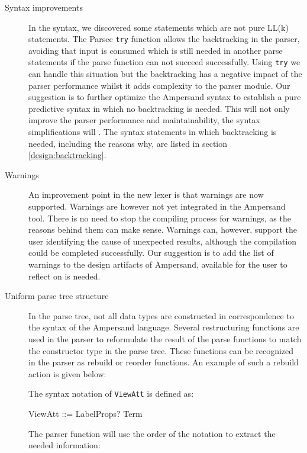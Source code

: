 \begin{description}
  \item[Syntax improvements]
    In the syntax, we discovered some statements which are not pure LL(k) statements.
    The Parsec \texttt{try} function allows the backtracking in the parser, avoiding that input is consumed which is still needed in another parse statements if the parse function can not succeed successfully.
    Using \texttt{try} we can handle this situation but the backtracking has a negative impact of the parser performance whilst it adds complexity to the parser module. 
    Our suggestion is to further optimize the Ampersand syntax to establish a pure predictive syntax in which no backtracking is needed.
    This will not only improve the parser performance and maintainability, the syntax simplifications will .
    The syntax statements in which backtracking is needed, including the reasons why, are listed in section \ref{design:backtracking}.

  \item[Warnings]
    An improvement point in the new lexer is that warnings are now supported. 
    Warnings are however not yet integrated in the Ampersand tool.
    There is no need to stop the compiling process for warnings, as the reasons behind them can make sense.
    Warnings can, however, support the user identifying the cause of unexpected results, although the compilation could be completed successfully.
    Our suggestion is to add the list of warnings to the design artifacts of Ampersand, available for the user to reflect on is needed.

  \item[Uniform parse tree structure]
  
   In the parse tree, not all data types are constructed in correspondence to the syntax of the Ampersand language.
   Several restructuring functions are used in the parser to reformulate the result of the parse functions to match the constructor type in the parse tree.
   These functions can be recognized in the parser as rebuild or reorder functions.
   An example of such a rebuild action is given below:

   The syntax notation of \texttt{ViewAtt} is defined as:
   \begin{ebnf}
    ViewAtt ::= LabelProps? Term\end{ebnf}
   
   The parser function will use the order of the notation to extract the needed information:


\end{description}
